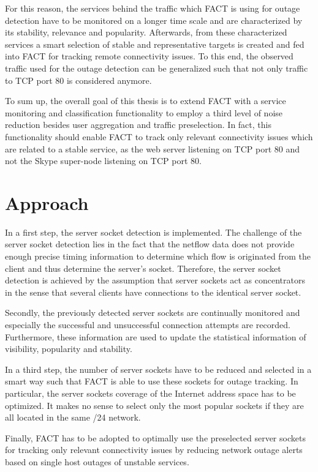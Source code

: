 \documentclass{sigcomm-alternate}
\begin{document}
For this reason, the services behind the traffic which FACT is using for outage detection have to be monitored on a longer time scale and are characterized by its stability, relevance and popularity. Afterwards, from these characterized services a smart selection of stable and representative targets is created and fed into FACT for tracking remote connectivity issues. To this end, the observed traffic used for the outage detection can be generalized such that not only traffic to TCP port 80 is considered anymore. 

To sum up, the overall goal of this thesis is to extend FACT with a service monitoring and classification functionality to employ a third level of noise reduction besides user aggregation and traffic preselection. In fact, this functionality should enable FACT to track only relevant connectivity issues which are related to a stable service, as the web server listening on TCP port 80 and not the Skype super-node listening on TCP port 80.

\section{Approach}

In a first step, the server socket detection is implemented. The challenge of the server socket detection lies in the fact that the netflow data does not provide enough precise timing information to determine which flow is originated from the client and thus determine the server's socket. Therefore, the server socket detection is achieved by the assumption that server sockets act as concentrators in the sense that several clients have connections to the identical server socket.

Secondly, the previously detected server sockets are continually monitored and especially the successful and unsuccessful connection attempts are recorded. Furthermore, these information are used to update the statistical information of visibility, popularity and stability.

In a third step, the number of server sockets have to be reduced and selected in a smart way such that FACT is able to use these sockets for outage tracking. In particular, the server sockets coverage of the Internet address space has to be optimized. It makes no sense to select only the most popular sockets if they are all located in the same /24 network. 

Finally, FACT has to be adopted to optimally use the preselected server sockets for tracking only relevant connectivity issues by reducing network outage alerts based on single host outages of unstable services. 
\end{document}
